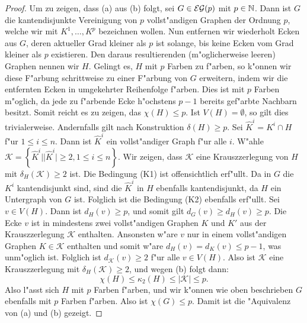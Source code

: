 \begin{proof}
  Um zu zeigen, dass (a) aus (b) folgt, sei $G\in {\cal EG}(p) $ mit $p\in {\mathbb{N}}$. Dann ist $G$ die kantendisjunkte Vereinigung von $p$ vollst"andigen Graphen der Ordnung $p$, welche wir mit $K^{1},\dots, K^{p}$ bezeichnen wollen. Nun entfernen wir wiederholt Ecken aus $G$,  deren aktueller Grad kleiner als $p$ ist solange, bis keine Ecken vom Grad kleiner als $p$ existieren. Den daraus resultierenden (m"oglicherweise leeren) Graphen nennen wir $H$. 
  Gelingt es, $H$ mit $p$ Farben zu f"arben, so k"onnen wir diese F"arbung schrittweise zu einer F"arbung von $G$ erweitern, indem wir die entfernten Ecken in umgekehrter Reihenfolge f"arben. Dies ist mit $p$ Farben m"oglich, da jede zu f"arbende Ecke h"ochstens $p-1$ bereits gef"arbte Nachbarn besitzt.
  Somit reicht es zu zeigen, das $\chi(H) \leq p$. Ist $V(H) =\emptyset$, so gilt dies trivialerweise. Andernfalls gilt nach Konstruktion $\delta(H) \geq p $. 
  Sei $\hat{K}^i = K^{i} \cap H$ f"ur $1\leq i \leq n$. Dann ist $\hat{K}^i$ ein vollst"andiger Graph f"ur alle $i$. W"ahle $\mathcal{K} = \left\{ \hat{K}^i | | \hat{K}^i| \geq 2  , 1\leq i \leq n\right\}$. Wir zeigen, dass $\mathcal{K}$ eine Krauszzerlegung von $H$ mit $\delta_{H}(\mathcal{K}) \geq 2$ ist.
  Die Bedingung (K1) ist offensichtlich erf"ullt. Da in $G$ die $K^{i}$ kantendisjunkt sind, sind die $\hat{K}^{i}$ in $H$ ebenfalls kantendisjunkt, da $H$ ein Untergraph von $G$ ist. Folglich ist die Bedingung (K2) ebenfalls erf"ullt. Sei $v\in V(H)$. Dann ist $d_{H}(v) \geq p$, und somit gilt $d_{G}(v) \geq d_H(v) \geq p$. 
  Die Ecke $v$ ist in mindestens zwei vollst"andigen Graphen $K$ und $K'$ aus der Krauszzerlegung $\mathcal{K}$ enthalten. 
  Ansonsten w"are $v$ nur in einem vollst"andigen Graphen $K \in \mathcal{K}$ enthalten und somit w"are $d_{H}(v) = d_{K}(v) \leq p-1$, was unm"oglich ist. 
  Folglich ist $d_{\mathcal{K}}(v) \geq 2$ f"ur alle $v \in V(H)$. Also ist $\mathcal{K}$ eine Krauszzerlegung mit $\delta_{H}(\mathcal{K}) \geq 2$, und wegen (b) folgt dann:
  \begin{equation*}
    \chi(H) \leq \kappa_{2}(H) \leq |\mathcal{K}| \leq p .
  \end{equation*}
  Also l"asst sich $H$ mit $p$ Farben f"arben, und wir k"onnen wie oben beschrieben $G$ ebenfalls mit $p$ Farben f"arben. Also ist $\chi(G) \leq p$.
  Damit ist die "Aquivalenz von (a) und (b) gezeigt. 


\end{proof}
